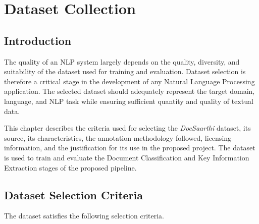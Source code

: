 
\chapter{Dataset Collection}

\section{Introduction}

The quality of an NLP system largely depends on the quality, diversity, and suitability of the dataset used for training and evaluation. Dataset selection is therefore a critical stage in the development of any Natural Language Processing application. The selected dataset should adequately represent the target domain, language, and NLP task while ensuring sufficient quantity and quality of textual data.

This chapter describes the criteria used for selecting the \textit{DocSaarthi} dataset, its source, its characteristics, the annotation methodology followed, licensing information, and the justification for its use in the proposed project. The dataset is used to train and evaluate the Document Classification and Key Information Extraction stages of the proposed pipeline.


\section{Dataset Selection Criteria}

The dataset satisfies the following selection criteria.


